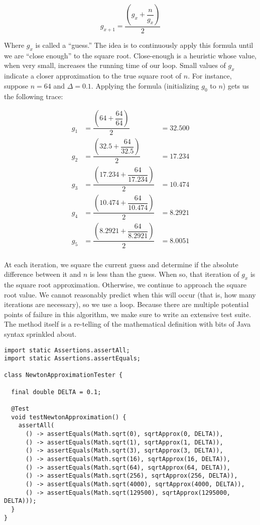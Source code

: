 
\[
    g_{x+1} = \dfrac{\left(g_x + \dfrac{n}{g_x}\right)}{2}
\]

Where $g_x$ is called a ``guess.'' The idea is to continuously apply this formula until we are ``close enough'' to the square root. Close-enough is a heuristic whose value, when very small, increases the running time of our loop. Small values of $g_x$ indicate a closer approximation to the true square root of $n$. For instance, suppose $n=64$ and $\Delta=0.1$. Applying the formula (initializing $g_0$ to $n$) gets us the following trace:

\begin{align*}
g_1 &= \dfrac{\left(64 + \dfrac{64}{64}\right)}{2} &= 32.500\\
g_2 &= \dfrac{\left(32.5 + \dfrac{64}{32.5}\right)}{2} &= 17.234\\
g_3 &= \dfrac{\left(17.234 + \dfrac{64}{17.234}\right)}{2} &= 10.474\\
g_4 &= \dfrac{\left(10.474 + \dfrac{64}{10.474}\right)}{2} &= 8.2921\\
g_5 &= \dfrac{\left(8.2921 + \dfrac{64}{8.2921}\right)}{2} &= 8.0051\\
\end{align*}

At each iteration, we square the current guess and determine if the absolute difference between it and $n$ is less than the guess. When so, that iteration of $g_x$ is the square root approximation. Otherwise, we continue to approach the square root value. We cannot reasonably predict when this will occur (that is, how many iterations are necessary), so we use a  loop. Because there are multiple potential points of failure in this algorithm, we make sure to write an extensive test suite. The method itself is a re-telling of the mathematical definition with bits of Java syntax sprinkled about. 

\begin{lstlisting}[language=MyJava]
import static Assertions.assertAll;
import static Assertions.assertEquals;

class NewtonApproximationTester {

  final double DELTA = 0.1;

  @Test
  void testNewtonApproximation() {
    assertAll(
      () -> assertEquals(Math.sqrt(0), sqrtApprox(0, DELTA)),
      () -> assertEquals(Math.sqrt(1), sqrtApprox(1, DELTA)),
      () -> assertEquals(Math.sqrt(3), sqrtApprox(3, DELTA)),
      () -> assertEquals(Math.sqrt(16), sqrtApprox(16, DELTA)),
      () -> assertEquals(Math.sqrt(64), sqrtApprox(64, DELTA)),
      () -> assertEquals(Math.sqrt(256), sqrtApprox(256, DELTA)),
      () -> assertEquals(Math.sqrt(4000), sqrtApprox(4000, DELTA)),
      () -> assertEquals(Math.sqrt(129500), sqrtApprox(1295000, DELTA)));
  }
}
\end{lstlisting}


